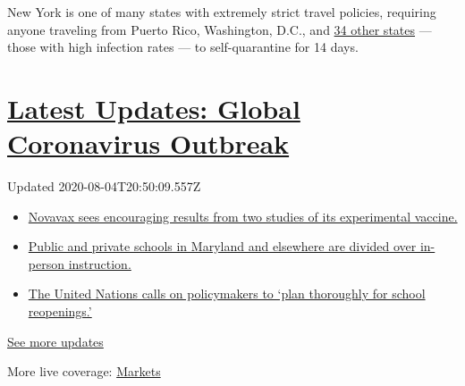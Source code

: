 New York is one of many states with extremely strict travel policies,
requiring anyone traveling from Puerto Rico, Washington, D.C., and
\href{https://coronavirus.health.ny.gov/covid-19-travel-advisory}{34
other states} --- those with high infection rates --- to self-quarantine
for 14 days.

\hypertarget{latest-updates-global-coronavirus-outbreak}{%
\section{\texorpdfstring{\href{https://www.nytimes3xbfgragh.onion/2020/08/04/world/coronavirus-cases.html?action=click\&pgtype=Article\&state=default\&region=MAIN_CONTENT_1\&context=storylines_live_updates}{Latest
Updates: Global Coronavirus
Outbreak}}{Latest Updates: Global Coronavirus Outbreak}}\label{latest-updates-global-coronavirus-outbreak}}

Updated 2020-08-04T20:50:09.557Z

\begin{itemize}
\tightlist
\item
  \href{https://www.nytimes3xbfgragh.onion/2020/08/04/world/coronavirus-cases.html?action=click\&pgtype=Article\&state=default\&region=MAIN_CONTENT_1\&context=storylines_live_updates\#link-1228a480}{Novavax
  sees encouraging results from two studies of its experimental
  vaccine.}
\item
  \href{https://www.nytimes3xbfgragh.onion/2020/08/04/world/coronavirus-cases.html?action=click\&pgtype=Article\&state=default\&region=MAIN_CONTENT_1\&context=storylines_live_updates\#link-4825b93}{Public
  and private schools in Maryland and elsewhere are divided over
  in-person instruction.}
\item
  \href{https://www.nytimes3xbfgragh.onion/2020/08/04/world/coronavirus-cases.html?action=click\&pgtype=Article\&state=default\&region=MAIN_CONTENT_1\&context=storylines_live_updates\#link-50f7386d}{The
  United Nations calls on policymakers to `plan thoroughly for school
  reopenings.'}
\end{itemize}

\href{https://www.nytimes3xbfgragh.onion/2020/08/04/world/coronavirus-cases.html?action=click\&pgtype=Article\&state=default\&region=MAIN_CONTENT_1\&context=storylines_live_updates}{See
more updates}

More live coverage:
\href{https://www.nytimes3xbfgragh.onion/live/2020/08/04/business/stock-market-today-coronavirus?action=click\&pgtype=Article\&state=default\&region=MAIN_CONTENT_1\&context=storylines_live_updates}{Markets}

